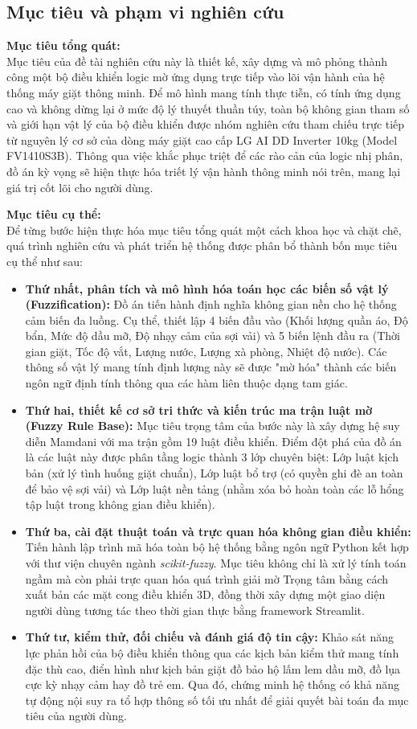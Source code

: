\documentclass[12pt, a4paper]{article}
\begin{document}
\subsection{Mục tiêu và phạm vi nghiên cứu}
\textbf{Mục tiêu tổng quát:}\\
Mục tiêu của đề tài nghiên cứu này là thiết kế, xây dựng và mô phỏng thành công một bộ điều khiển logic mờ ứng dụng trực tiếp vào lõi vận hành của hệ thống máy giặt thông minh. Để mô hình mang tính thực tiễn, có tính ứng dụng cao và không dừng lại ở mức độ lý thuyết thuần túy, toàn bộ không gian tham số và giới hạn vật lý của bộ điều khiển được nhóm nghiên cứu tham chiếu trực tiếp từ nguyên lý cơ sở của dòng máy giặt cao cấp LG AI DD Inverter 10kg (Model FV1410S3B). Thông qua việc khắc phục triệt để các rào cản của logic nhị phân, đồ án kỳ vọng sẽ hiện thực hóa triết lý vận hành thông minh nói trên, mang lại giá trị cốt lõi cho người dùng.

\textbf{Mục tiêu cụ thể:}\\
Để từng bước hiện thực hóa mục tiêu tổng quát một cách khoa học và chặt chẽ, quá trình nghiên cứu và phát triển hệ thống được phân bổ thành bốn mục tiêu cụ thể như sau:
\begin{itemize}
    \item \textbf{Thứ nhất, phân tích và mô hình hóa toán học các biến số vật lý (Fuzzification):} Đồ án tiến hành định nghĩa không gian nền cho hệ thống cảm biến đa luồng. Cụ thể, thiết lập 4 biến đầu vào (Khối lượng quần áo, Độ bẩn, Mức độ dầu mỡ, Độ nhạy cảm của sợi vải) và 5 biến lệnh đầu ra (Thời gian giặt, Tốc độ vắt, Lượng nước, Lượng xà phòng, Nhiệt độ nước). Các thông số vật lý mang tính định lượng này sẽ được "mờ hóa" thành các biến ngôn ngữ định tính thông qua các hàm liên thuộc dạng tam giác.
    \item \textbf{Thứ hai, thiết kế cơ sở tri thức và kiến trúc ma trận luật mờ (Fuzzy Rule Base):} Mục tiêu trọng tâm của bước này là xây dựng hệ suy diễn Mamdani với ma trận gồm 19 luật điều khiển. Điểm đột phá của đồ án là các luật này được phân tầng logic thành 3 lớp chuyên biệt: Lớp luật kịch bản (xử lý tình huống giặt chuẩn), Lớp luật bổ trợ (có quyền ghi đè an toàn để bảo vệ sợi vải) và Lớp luật nền tảng (nhằm xóa bỏ hoàn toàn các lỗ hổng tập luật trong không gian điều khiển).
    \item \textbf{Thứ ba, cài đặt thuật toán và trực quan hóa không gian điều khiển:} Tiến hành lập trình mã hóa toàn bộ hệ thống bằng ngôn ngữ Python kết hợp với thư viện chuyên ngành \textit{scikit-fuzzy}. Mục tiêu không chỉ là xử lý tính toán ngầm mà còn phải trực quan hóa quá trình giải mờ Trọng tâm bằng cách xuất bản các mặt cong điều khiển 3D, đồng thời xây dựng một giao diện người dùng tương tác theo thời gian thực bằng framework Streamlit.
    \item \textbf{Thứ tư, kiểm thử, đối chiếu và đánh giá độ tin cậy:} Khảo sát năng lực phản hồi của bộ điều khiển thông qua các kịch bản kiểm thử mang tính đặc thù cao, điển hình như kịch bản giặt đồ bảo hộ lấm lem dầu mỡ, đồ lụa cực kỳ nhạy cảm hay đồ trẻ em. Qua đó, chứng minh hệ thống có khả năng tự động nội suy ra tổ hợp thông số tối ưu nhất để giải quyết bài toán đa mục tiêu của người dùng.
\end{itemize}
\end{document}
